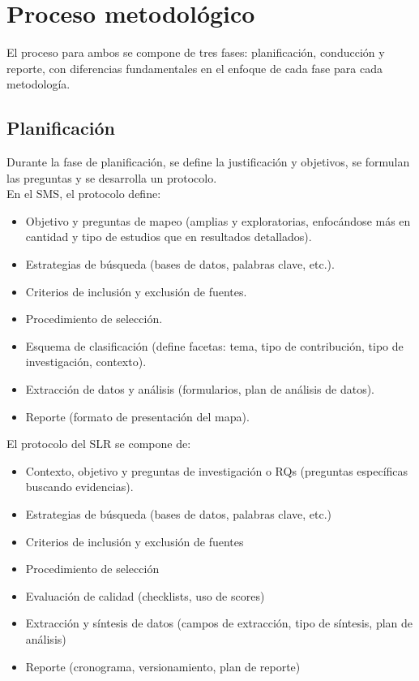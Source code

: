 \section{Proceso metodológico}
El proceso para ambos se compone de tres fases: planificación, conducción y reporte, con diferencias fundamentales en el enfoque de cada fase para cada metodología.
\subsection{Planificación}
Durante la fase de planificación, se define la justificación y objetivos, se formulan las preguntas y se desarrolla un protocolo.\\ 

En el SMS, el protocolo\cite{definicion_sms} define:
\begin{itemize}
    \item Objetivo y preguntas de mapeo (amplias y exploratorias, enfocándose más en cantidad y tipo de estudios que en resultados detallados).
    \item Estrategias de búsqueda (bases de datos, palabras clave, etc.).
    \item Criterios de inclusión y exclusión de fuentes.
    \item Procedimiento de selección.
    \item Esquema de clasificación (define facetas: tema, tipo de contribución, tipo de investigación, contexto).
    \item Extracción de datos y análisis (formularios, plan de análisis de datos).
    \item Reporte (formato de presentación del mapa).\\
\end{itemize}

El protocolo del SLR\cite{kitchenham2009slr} se compone de:
\begin{itemize}
    \item Contexto, objetivo y preguntas de investigación o RQs (preguntas específicas buscando evidencias).
    \item Estrategias de búsqueda (bases de datos, palabras clave, etc.)
    \item Criterios de inclusión y exclusión de fuentes
    \item Procedimiento de selección
    \item Evaluación de calidad (checklists, uso de scores)
    \item Extracción y síntesis de datos (campos de extracción, tipo de síntesis, plan de análisis)
    \item Reporte (cronograma, versionamiento, plan de reporte)\\
\end{itemize}


